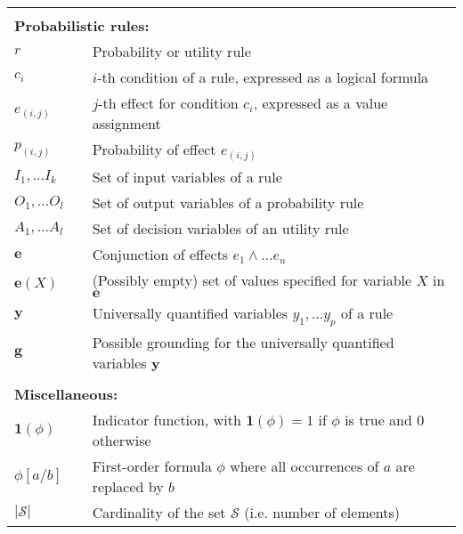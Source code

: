 \begin{longtable}{lp{5mm}p{11cm}}
&&  \vspace{3mm} \\
\multicolumn{3}{l}{\textbf{Probabilistic rules:}} \vspace{2mm} \\
$r$ && Probability or utility rule \\
$c_i$ && $i$-th condition of a rule, expressed as a logical formula \\
$e_{(i,j)}$ && $j$-th effect for condition $c_i$, expressed as a value assignment \\
$p_{(i,j)}$ && Probability of effect $e_{(i,j)}$ \\
$I_1,...I_{k}$  && Set of input variables of a rule\\
$O_1,...O_{l}$ && Set of output variables of a probability rule \\
$A_1,...A_{l}$ && Set of decision variables of an utility rule \\
$\mathbf{e}$ && Conjunction of effects $e_1 \land ... e_n$ \\
$\mathbf{e}(X)$ && (Possibly empty) set of values specified for variable $X$ in $\mathbf{e}$ \\
$\mathbf{y}$ && Universally quantified variables $y_1,... y_p$ of a rule  \\
$\mathbf{g}$ && Possible grounding for the universally quantified variables $\mathbf{y}$ \\
&&  \vspace{3mm} \\
\multicolumn{3}{l}{\textbf{Miscellaneous:}} \vspace{2mm} \\
$\mathbf{1}(\phi)$ && Indicator function, with $\mathbf{1}(\phi) = 1$ if $\phi$ is true and 0 otherwise \\
$\phi[a / b]$ && First-order formula $\phi$ where all occurrences of $a$ are replaced by $b$ \\
$|\mathcal{S}|$ && Cardinality of the set $\mathcal{S}$ (i.e. number of elements) 
\end{longtable}
